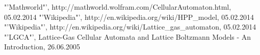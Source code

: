 \documentclass[paper=a4, fontsize=11pt]{scrartcl} %
\numberwithin{equation}{section} %
\numberwithin{figure}{section} %
\numberwithin{table}{section} %
\begin{document}
\pagebreak
\listoffigures

\begin{thebibliography}{xxxxxxxxxxxxxxxxxxxxxxxxx}
   "'Mathworld"', http://mathworld.wolfram.com/CellularAutomaton.html, 05.02.2014
   "'Wikipedia"', http://en.wikipedia.org/wiki/HPP\_model, 05.02.2014
   "'Wikipedia"', http://en.wikipedia.org/wiki/Lattice\_gas\_automaton, 05.02.2014
   "'LGCA"', Lattice-Gas Cellular
Automata and
Lattice Boltzmann Models
- An Introduction, 26.06.2005
\end{thebibliography}
\end{document}
